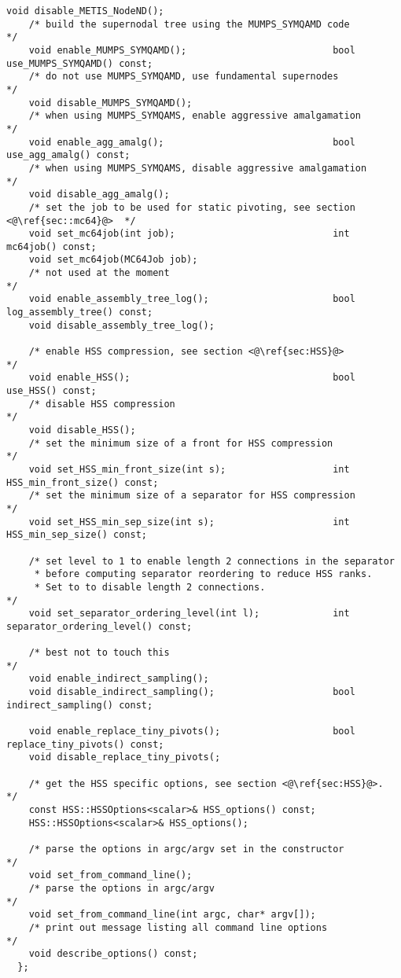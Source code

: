 \documentclass{article}
\begin{document}
\begin{lstlisting}[style=C]
    void disable_METIS_NodeND();
    /* build the supernodal tree using the MUMPS_SYMQAMD code        */
    void enable_MUMPS_SYMQAMD();                          bool use_MUMPS_SYMQAMD() const;
    /* do not use MUMPS_SYMQAMD, use fundamental supernodes          */
    void disable_MUMPS_SYMQAMD();
    /* when using MUMPS_SYMQAMS, enable aggressive amalgamation      */
    void enable_agg_amalg();                              bool use_agg_amalg() const;
    /* when using MUMPS_SYMQAMS, disable aggressive amalgamation      */
    void disable_agg_amalg();
    /* set the job to be used for static pivoting, see section <@\ref{sec::mc64}@>  */
    void set_mc64job(int job);                            int mc64job() const;
    void set_mc64job(MC64Job job);
    /* not used at the moment                                         */
    void enable_assembly_tree_log();                      bool log_assembly_tree() const;
    void disable_assembly_tree_log();

    /* enable HSS compression, see section <@\ref{sec:HSS}@>                          */
    void enable_HSS();                                    bool use_HSS() const;
    /* disable HSS compression                                        */
    void disable_HSS();
    /* set the minimum size of a front for HSS compression            */
    void set_HSS_min_front_size(int s);                   int HSS_min_front_size() const;
    /* set the minimum size of a separator for HSS compression        */
    void set_HSS_min_sep_size(int s);                     int HSS_min_sep_size() const;

    /* set level to 1 to enable length 2 connections in the separator
     * before computing separator reordering to reduce HSS ranks.
     * Set to to disable length 2 connections.                        */
    void set_separator_ordering_level(int l);             int separator_ordering_level() const;

    /* best not to touch this                                         */
    void enable_indirect_sampling();
    void disable_indirect_sampling();                     bool indirect_sampling() const;

    void enable_replace_tiny_pivots();                    bool replace_tiny_pivots() const;
    void disable_replace_tiny_pivots(;

    /* get the HSS specific options, see section <@\ref{sec:HSS}@>.                   */
    const HSS::HSSOptions<scalar>& HSS_options() const;
    HSS::HSSOptions<scalar>& HSS_options();

    /* parse the options in argc/argv set in the constructor          */
    void set_from_command_line();
    /* parse the options in argc/argv                                 */
    void set_from_command_line(int argc, char* argv[]);
    /* print out message listing all command line options             */
    void describe_options() const;
  };
\end{lstlisting}
\end{document}
